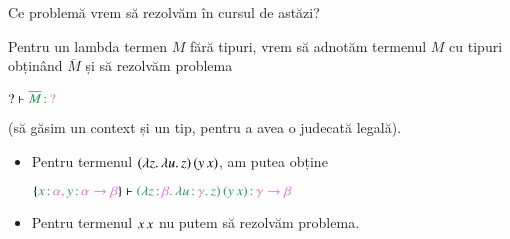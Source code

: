 \documentclass[xcolor=pdftex,romanian,colorlinks]{beamer}
\begin{document}
\begin{frame}{Ce problemă vrem să rezolvăm în cursul de astăzi?}


Pentru un lambda termen $M$ fără tipuri, vrem să adnotăm termenul $M$ cu tipuri obținând $\overline{M}$ și să rezolvăm problema
\vspace{-.3cm}
\begin{center}
$? \vdash \type{\overline{M}}{?}$
\end{center}
(să găsim un context și un tip, pentru a avea o judecată legală).

\vspace{.2cm}  
\textbf{}
\vspace{-.2cm}
\begin{itemize}
	\item Pentru termenul {\color{True}$(\lambda z.\,\lambda u.\,z)\, (y\, x)$}, am putea obține
	\begin{center}
	$\{\type{x}{\alpha, \type{y}{\alpha \to \beta}}\} \vdash \type{\app{(\abs{\type{z}{\beta}}{\abs{\type{u}{\gamma}}{z}})}{(\app{y}{x})}}{\gamma \to \beta}$
	\end{center}
	\vspace{.2cm}
	\item Pentru termenul {\color{False}$x\, x$} nu putem să rezolvăm problema.
\end{itemize}
\end{frame}
\end{document}
